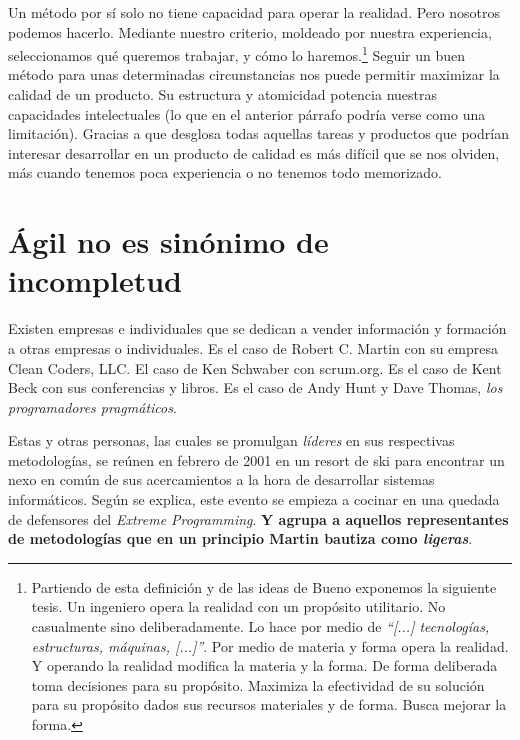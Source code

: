 Un método por sí solo no tiene capacidad para operar la realidad. Pero nosotros podemos hacerlo.
Mediante nuestro criterio, moldeado por nuestra experiencia, seleccionamos qué queremos trabajar,
y cómo lo haremos\cite[Distinción entre método y metodología]{MetodoUNAM}.\footnote{%
Partiendo de esta definición y de las ideas de Bueno \cite{TeoríaDelCierreCategorial} exponemos
la siguiente tesis.
Un ingeniero opera la realidad con un propósito utilitario. No casualmente sino deliberadamente.
Lo hace por medio de \textit{``[...] tecnologías, estructuras, máquinas, [...]''}.
Por medio de materia y forma opera la realidad. Y operando la realidad modifica la materia y
la forma. De forma deliberada toma decisiones para su propósito. Maximiza la
efectividad de su solución para su propósito dados sus recursos materiales y de forma.
Busca mejorar la forma.
}
 Seguir un buen método para unas determinadas circunstancias nos puede permitir maximizar la
calidad de un producto. Su estructura y atomicidad potencia nuestras capacidades intelectuales
(lo que en el anterior párrafo podría verse como una limitación).
Gracias a que desglosa todas aquellas tareas y productos que podrían interesar desarrollar
en un producto de calidad es más difícil que se nos olviden, más cuando tenemos poca experiencia
o no tenemos todo memorizado.

\section{Ágil no es sinónimo de incompletud}

Existen empresas e individuales que se dedican a vender información y formación a otras empresas
o individuales. Es el caso de Robert C. Martin con su empresa Clean Coders, LLC. El caso de 
Ken Schwaber con scrum.org. Es el caso de Kent Beck con sus conferencias y libros. Es el caso
de Andy Hunt y Dave Thomas, \textit{los programadores pragmáticos}.

Estas y otras personas, las cuales se promulgan \textit{líderes} en sus respectivas metodologías,
se reúnen en febrero de 2001 en un resort de ski para encontrar un nexo en común
de sus acercamientos a la hora de desarrollar sistemas informáticos. Según se explica, este evento
se empieza a cocinar en una quedada de defensores del \textit{Extreme Programming}.
\textbf{Y agrupa a aquellos representantes de metodologías que en un principio 
Martin bautiza como \textit{ligeras}}.
\cite{HistoriaManifiestoAgilJim} \cite[Snowbird]{AgileBackToBasics}

